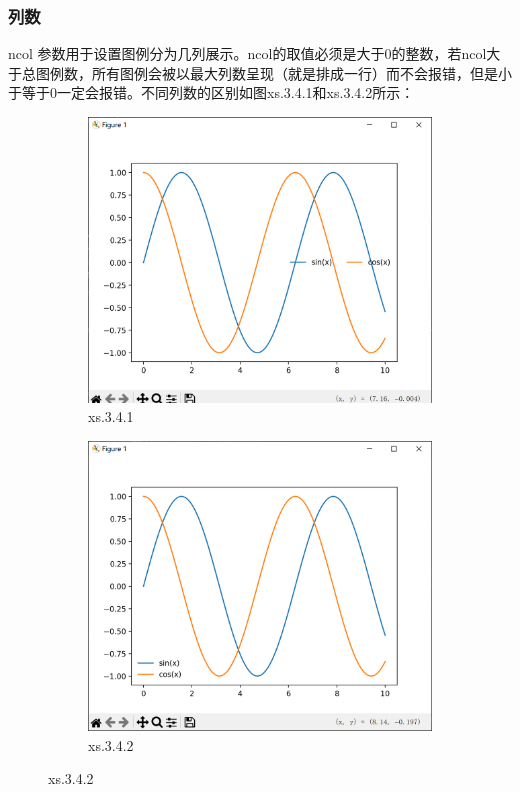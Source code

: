 \documentclass[12pt]{article}
\begin{document}
\subsubsection{列数}
  ncol 参数用于设置图例分为几列展示。ncol的取值必须是大于0的整数，若ncol大于总图例数，所有图例会被以最大列数呈现（就是排成一行）而不会报错，但是小于等于0一定会报错。不同列数的区别如图xs.3.4.1和xs.3.4.2所示：
  \begin{figure}[H]
    \centering
    \begin{subfigure}[b]{0.45\textwidth}
        \includegraphics[width=\textwidth]{图例 Pic3 .png} %
        \caption{xs.3.4.1}
        \label{fig:line-graph2}
    \end{subfigure}
    \hfill
    \begin{subfigure}[b]{0.45\textwidth}
        \includegraphics[width=\textwidth]{图例 Pic4 .png} %
        \caption{xs.3.4.2}
        \label{fig:line-graph2-pic2}
    \end{subfigure}
\end{figure}
\end{document}
